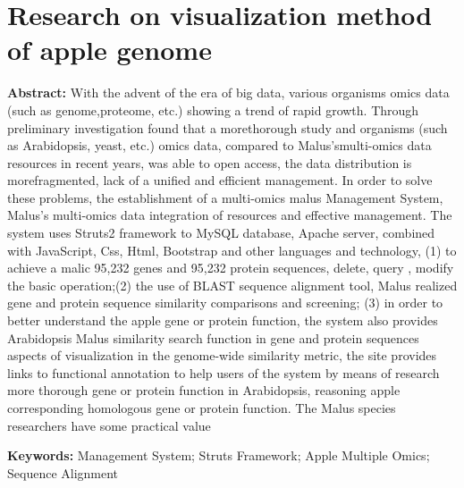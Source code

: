 \thispagestyle{empty}
\chapter*{Research on visualization method of apple genome}

\vspace{1em}

\textbf {\large Abstract: }\normalsize{With the advent of the era of big data, various organisms omics data (such as genome,proteome, etc.) showing a trend of rapid growth. Through preliminary investigation found that a morethorough study and organisms (such as Arabidopsis, yeast, etc.) omics data, compared to Malus'smulti-omics data resources in recent years, was able to open access, the data distribution is morefragmented, lack of a unified and efficient management. In order to solve these problems, the
establishment of a multi-omics malus Management System, Malus's multi-omics data integration of resources and effective management. The system uses Struts2 framework to MySQL database, Apache server, combined with JavaScript, Css, Html, Bootstrap and other languages and technology, (1) to achieve a malic 95,232 genes and 95,232 protein sequences, delete, query , modify the basic operation;(2) the use of BLAST sequence alignment tool, Malus realized gene and protein sequence similarity
comparisons and screening; (3) in order to better understand the apple gene or protein function, the
system also provides Arabidopsis Malus similarity search function in gene and protein sequences aspects
of visualization in the genome-wide similarity metric, the site provides links to functional annotation to
help users of the system by means of research more thorough gene or protein function in Arabidopsis,
reasoning apple corresponding homologous gene or protein function. The Malus species researchers have
some practical value}

\textbf{\large Keywords: }\normalsize{Management System; Struts Framework; Apple Multiple Omics; Sequence Alignment}


